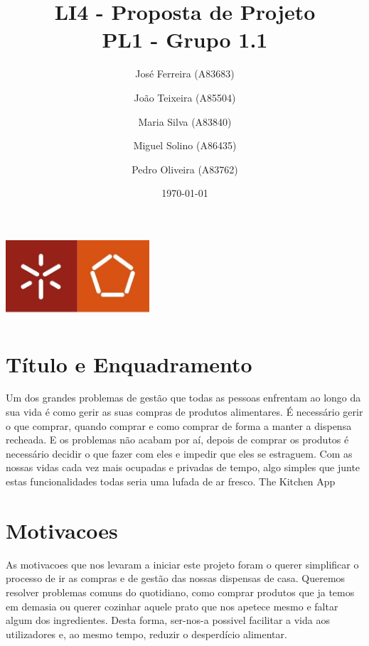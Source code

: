 \documentclass[a4paper]{report}
\begin{document}
\title{LI4 - Proposta de Projeto\\ 
\large PL1 - Grupo 1.1}
\author{José Ferreira (A83683) \and João Teixeira (A85504) \and Maria Silva
(A83840) \and Miguel Solino (A86435) \and Pedro Oliveira (A83762)}
\date{\today}

\begin{center}
    \begin{minipage}{0.75\linewidth}
        \centering
        \includegraphics[width=0.4\textwidth]{images/eng.jpeg}\par\vspace{1cm}
        \vspace{1.5cm}
        \href{https://www.uminho.pt/PT}
        {\color{black}{\scshape\LARGE Universidade do Minho}} \par
        \vspace{1cm}
        \href{https://www.di.uminho.pt/}
        {\color{black}{\scshape\Large Departamento de Informática}} \par
        \vspace{1.5cm}
        \maketitle
    \end{minipage}
\end{center}

\pagebreak
\section{Título e Enquadramento}
Um dos grandes problemas de gestão que todas as pessoas enfrentam ao longo da
sua vida é como gerir as suas compras de produtos alimentares. É necessário
gerir o que comprar, quando comprar e como comprar de forma a manter a dispensa
recheada. E os problemas não acabam por aí, depois de comprar os produtos é
necessário decidir o que fazer com eles e impedir que eles se estraguem. Com as
nossas vidas cada vez mais ocupadas e privadas de tempo, algo simples que junte
estas funcionalidades todas seria uma lufada de ar fresco.
The Kitchen App

\section{Motivacoes}
As motivacoes que nos levaram a iniciar este projeto foram o querer simplificar
o processo de ir as compras e de gestão das nossas dispensas de casa.
Queremos resolver problemas comuns do quotidiano, como comprar produtos que 
ja temos em demasia ou querer cozinhar aquele prato
que nos apetece mesmo e faltar algum dos ingredientes. 
Desta forma, ser-nos-a possivel facilitar a vida aos utilizadores e, 
ao mesmo tempo, reduzir o desperdício alimentar.
\end{document}
